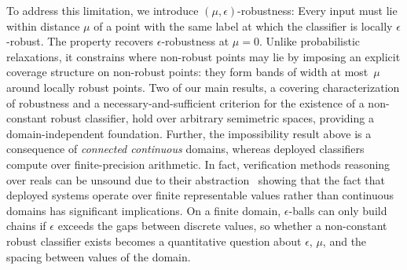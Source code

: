 To address this limitation, we introduce $(\mu,\epsilon)$-robustness:
Every input must lie within distance $\mu$ of a point with the same label at which the classifier is locally $\epsilon$-robust. 
The property recovers $\epsilon$-robustness at $\mu = 0$.
Unlike probabilistic relaxations, it constrains where non-robust points may lie by imposing an explicit coverage structure on non-robust points:
they form bands of width at most~$\mu$ around locally robust points.
Two of our main results, a covering characterization of robustness and a necessary-and-sufficient criterion for the
existence of a non-constant robust classifier, hold over arbitrary semimetric spaces,
providing a domain-independent foundation.
Further, the impossibility result above is a consequence of \emph{connected
continuous} domains, whereas deployed classifiers compute over finite-precision
arithmetic. In fact, verification methods reasoning over reals can be unsound 
due to their abstraction~\cite{jia2021exploiting,cordeiro2025neural} showing that the fact that deployed systems operate over finite representable values rather than continuous domains has significant implications.
On a finite domain, $\epsilon$-balls can only build chains if $\epsilon$ exceeds the gaps between discrete values, so
whether a non-constant robust classifier exists becomes a quantitative question
about $\epsilon$, $\mu$, and the spacing between values of the domain.

